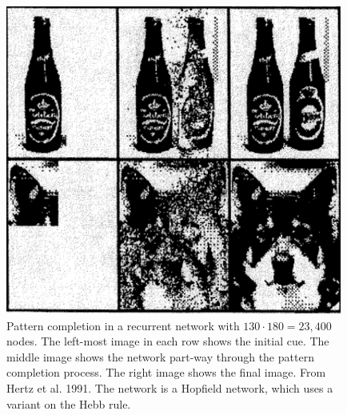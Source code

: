\begin{figure}[h]
\centering
\includegraphics[scale=.8]{./images/patternCompletionBeerDog.png}
\caption[From Hertz, Krogh, and Palmer, 1991 \cite{hertz1991introduction}.]{Pattern completion in a recurrent network with $130 \cdot 180 = 23,400$ nodes. The left-most image in each row shows the initial cue. The middle image shows the network part-way through the pattern completion process. The right image shows the final image. From Hertz et al. 1991. The network is a Hopfield network, which uses a variant on the Hebb rule.}
\label{patternCompletionBeerDog}
\end{figure}


